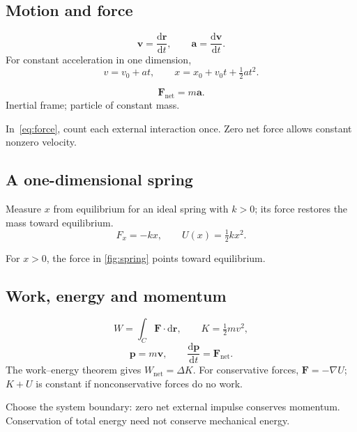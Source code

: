 \begin{referencecolumns}
\begin{referenceentry}
\section{Motion and force}
\[
\mathbf v=\frac{\mathrm d\mathbf r}{\mathrm dt},\qquad
\mathbf a=\frac{\mathrm d\mathbf v}{\mathrm dt}.
\]
For constant acceleration in one dimension,
\[
v=v_0+at,\qquad x=x_0+v_0t+\tfrac12 at^2.
\]
\begin{referenceformula}
\begin{equation}\label{eq:force}
\mathbf F_{\mathrm{net}}=m\mathbf a.
\end{equation}
Inertial frame; particle of constant mass.
\end{referenceformula}
In~\eqref{eq:force}, count each external interaction once. Zero net force
allows constant nonzero velocity.
\subsection{A one-dimensional spring}
Measure $x$ from equilibrium for an ideal spring with $k>0$; its force restores
the mass toward equilibrium.
\[
F_x=-kx,\qquad U(x)=\tfrac12 kx^2.
\]
\begin{referencefigure}
\begin{tikzpic}
\end{tikzpic}
\end{referencefigure}
For $x>0$, the force in \autoref{fig:spring} points toward equilibrium.
\end{referenceentry}

\begin{referenceentry}
\section{Work, energy and momentum}
\[
W=\int_C\mathbf F\cdot\mathrm d\mathbf r,\qquad K=\tfrac12 mv^2,
\]
\[
\mathbf p=m\mathbf v,\qquad
\frac{\mathrm d\mathbf p}{\mathrm dt}=\mathbf F_{\mathrm{net}}.
\]
The work--energy theorem gives $W_{\mathrm{net}}=\Delta K$. For conservative
forces, $\mathbf F=-\nabla U$; $K+U$ is constant if nonconservative forces do no work.
\begin{referencenote}[Conservation]
Choose the system boundary: zero net external impulse conserves momentum.
Conservation of total energy need not conserve mechanical energy.
\end{referencenote}
\end{referenceentry}


\end{referencecolumns}
